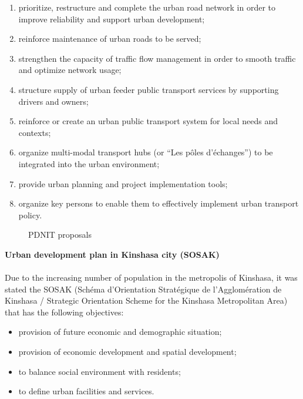 \documentclass{article}
\begin{document}
\begin{enumerate}
\item prioritize, restructure and complete the urban road network in order to improve reliability and support urban development; 
\item reinforce maintenance of urban roads to be served; 
\item strengthen the capacity of traffic flow management in order to smooth traffic and optimize network usage; 
\item structure supply of urban feeder public transport services by supporting drivers and owners; 
\item reinforce or create an urban public transport system for local needs and contexts; 
\item organize multi-modal transport hubs (or “Les pôles d’échanges”) to be integrated into the urban environment; 
\item provide urban planning and project implementation tools; 
\item organize key persons to enable them to effectively implement urban transport policy. 
\end{enumerate}
\begin{figure}[H]
{\centering
{}
\qquad
{}
\caption{PDNIT proposals}\par}
\end{figure}
\textbf{Urban development plan in Kinshasa city (SOSAK)}\\
\\
Due to the increasing number of population in the metropolis of Kinshasa, it was stated the SOSAK (Schéma d'Orientation Stratégique de l'Agglomération de Kinshasa / Strategic Orientation Scheme for the Kinshasa Metropolitan Area) that has the following objectives:\\
\begin{itemize}
\item provision of future economic and demographic situation;
\item provision of economic development and spatial development;
\item to balance social environment with residents;
\item to define urban facilities and services.
\end{itemize}
\end{document}
